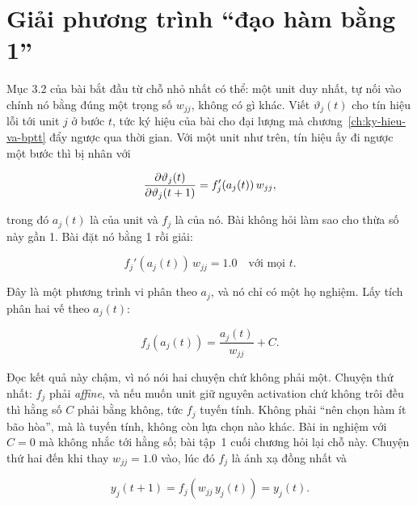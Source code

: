 \section{Giải phương trình \enquote{đạo hàm bằng 1}}
\label{sec:ch04-dong-loi-khong-doi}

%
Mục 3.2 của bài bắt đầu từ chỗ nhỏ nhất có thể: một unit duy nhất, tự nối vào
chính nó bằng đúng một trọng số \(w_{jj}\), không có gì khác. Viết
\(\vartheta_j(t)\) cho tín hiệu lỗi tới unit \(j\) ở bước \(t\), tức ký hiệu
của bài cho đại lượng mà chương~\ref{ch:ky-hieu-va-bptt} đẩy ngược qua thời
gian. Với một unit như trên, tín hiệu ấy đi ngược một bước thì bị nhân với

\begin{equation}
  \frac{\partial \vartheta_j(t)}{\partial \vartheta_j(t+1)} = f_j'(a_j(t))\, w_{jj},
  \label{eq:ch04-thua-so-mot-unit}
\end{equation}

trong đó \(a_j(t)\) là  của unit và \(f_j\)
là  của nó. Bài không hỏi làm sao cho
thừa số này gần 1. Bài đặt nó bằng 1 rồi giải:

\begin{equation}
  f_j'(a_j(t))\, w_{jj} = 1.0 \quad \text{với mọi } t.
  \label{eq:ch04-rang-buoc}
\end{equation}

Đây là một phương trình vi phân theo \(a_j\), và nó chỉ có một họ nghiệm. Lấy
tích phân hai vế theo \(a_j(t)\):

\begin{equation}
  f_j(a_j(t)) = \frac{a_j(t)}{w_{jj}} + C.
  \label{eq:ch04-nghiem}
\end{equation}

Đọc kết quả này chậm, vì nó nói hai chuyện chứ không phải một. Chuyện thứ nhất:
\(f_j\) phải \emph{affine}, và nếu muốn unit giữ nguyên activation chứ không
trôi đều thì hằng số \(C\) phải bằng không, tức \(f_j\) tuyến tính. Không phải
\enquote{nên chọn hàm ít bão hòa}, mà là tuyến tính, không còn lựa chọn nào
khác. Bài in nghiệm với \(C = 0\) mà không nhắc tới hằng số; bài tập~1 cuối
chương hỏi lại chỗ này. Chuyện thứ hai đến khi thay \(w_{jj} = 1.0\) vào, lúc
đó \(f_j\) là ánh xạ đồng nhất và

\begin{equation}
  y_j(t+1) = f_j(w_{jj}\, y_j(t)) = y_j(t).
  \label{eq:ch04-giu-nguyen}
\end{equation}


